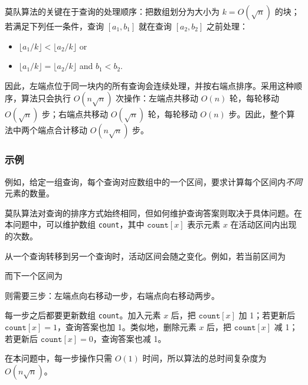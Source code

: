 莫队算法的关键在于查询的处理顺序：把数组划分为大小为 $k=O(\sqrt n)$ 的块；若满足下列任一条件，查询 $[a_1,b_1]$ 就在查询 $[a_2,b_2]$ 之前处理：
\begin{itemize}
\item $\lfloor a_1/k \rfloor < \lfloor a_2/k \rfloor$ or
\item $\lfloor a_1/k \rfloor = \lfloor a_2/k \rfloor$ and $b_1 < b_2$.
\end{itemize}

因此，左端点位于同一块内的所有查询会连续处理，并按右端点排序。采用这种顺序，算法只会执行 $O(n \sqrt n)$ 次操作：左端点共移动 $O(n)$ 轮，每轮移动 $O(\sqrt n)$ 步；右端点共移动 $O(\sqrt n)$ 轮，每轮移动 $O(n)$ 步。因此，整个算法中两个端点合计移动 $O(n \sqrt n)$ 步。

\subsubsection*{示例}

例如，给定一组查询，每个查询对应数组中的一个区间，要求计算每个区间内\emph{不同}元素的数量。

莫队算法对查询的排序方式始终相同，但如何维护查询答案则取决于具体问题。在本问题中，可以维护数组 \texttt{count}，其中 $\texttt{count}[x]$ 表示元素 $x$ 在活动区间内出现的次数。

从一个查询转移到另一个查询时，活动区间会随之变化。例如，若当前区间为
\begin{center}
\end{center}
而下一个区间为
\begin{center}
\end{center}
则需要三步：左端点向右移动一步，右端点向右移动两步。

每一步之后都要更新数组 \texttt{count}。加入元素 $x$ 后，把 $\texttt{count}[x]$ 加 1；若更新后 $\texttt{count}[x]=1$，查询答案也加 1。类似地，删除元素 $x$ 后，把 $\texttt{count}[x]$ 减 1；若更新后 $\texttt{count}[x]=0$，查询答案也减 1。

在本问题中，每一步操作只需 $O(1)$ 时间，所以算法的总时间复杂度为 $O(n \sqrt n)$。
